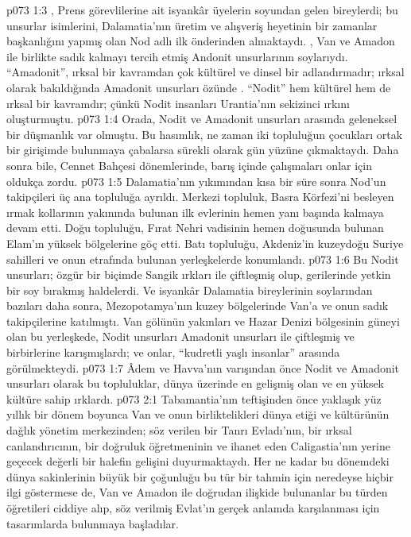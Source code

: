 \vs p073 1:3 , Prens görevlilerine ait isyankâr üyelerin soyundan gelen bireylerdi; bu unsurlar isimlerini, Dalamatia’nın üretim ve alışveriş heyetinin bir zamanlar başkanlığını yapmış olan Nod adlı ilk önderinden almaktaydı. , Van ve Amadon ile birlikte sadık kalmayı tercih etmiş Andonit unsurlarının soylarıydı. “Amadonit”, ırksal bir kavramdan çok kültürel ve dinsel bir adlandırmadır; ırksal olarak bakıldığında Amadonit unsurları özünde . “Nodit” hem kültürel hem de ırksal bir kavramdır; çünkü Nodit insanları Urantia’nın sekizinci ırkını oluşturmuştu.
\vs p073 1:4 Orada, Nodit ve Amadonit unsurları arasında geleneksel bir düşmanlık var olmuştu. Bu hasımlık, ne zaman iki topluluğun çocukları ortak bir girişimde bulunmaya çabalarsa sürekli olarak gün yüzüne çıkmaktaydı. Daha sonra bile, Cennet Bahçesi dönemlerinde, barış içinde çalışmaları onlar için oldukça zordu.
\vs p073 1:5 Dalamatia’nın yıkımından kısa bir süre sonra Nod’un takipçileri üç ana topluluğa ayrıldı. Merkezi topluluk, Basra Körfezi’ni besleyen ırmak kollarının yakınında bulunan ilk evlerinin hemen yanı başında kalmaya devam etti. Doğu topluluğu, Fırat Nehri vadisinin hemen doğusunda bulunan Elam’ın yüksek bölgelerine göç etti. Batı topluluğu, Akdeniz’in kuzeydoğu Suriye sahilleri ve onun etrafında bulunan yerleşkelerde konumlandı.
\vs p073 1:6 Bu Nodit unsurları; özgür bir biçimde Sangik ırkları ile çiftleşmiş olup, gerilerinde yetkin bir soy bırakmış haldelerdi. Ve isyankâr Dalamatia bireylerinin soylarından bazıları daha sonra, Mezopotamya’nın kuzey bölgelerinde Van’a ve onun sadık takipçilerine katılmıştı. Van gölünün yakınları ve Hazar Denizi bölgesinin güneyi olan bu yerleşkede, Nodit unsurları Amadonit unsurları ile çiftleşmiş ve birbirlerine karışmışlardı; ve onlar, “kudretli yaşlı insanlar” arasında görülmekteydi.
\vs p073 1:7 Âdem ve Havva’nın varışından önce Nodit ve Amadonit unsurları olarak bu topluluklar, dünya üzerinde en gelişmiş olan ve en yüksek kültüre sahip ırklardı.
\vs p073 2:1 Tabamantia’nın teftişinden önce yaklaşık yüz yıllık bir dönem boyunca Van ve onun birliktelikleri dünya etiği ve kültürünün dağlık yönetim merkezinden; söz verilen bir Tanrı Evladı’nın, bir ırksal canlandırıcının, bir doğruluk öğretmeninin ve ihanet eden Caligastia’nın yerine geçecek değerli bir halefin gelişini duyurmaktaydı. Her ne kadar bu dönemdeki dünya sakinlerinin büyük bir çoğunluğu bu tür bir tahmin için neredeyse hiçbir ilgi göstermese de, Van ve Amadon ile doğrudan ilişkide bulunanlar bu türden öğretileri ciddiye alıp, söz verilmiş Evlat’ın gerçek anlamda karşılanması için tasarımlarda bulunmaya başladılar.
